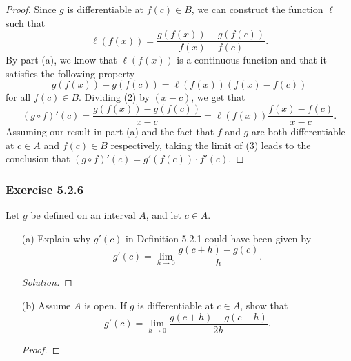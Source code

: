 \begin{enumerate}
\begin{proof}
        Since \( g  \) is differentiable at \( f(c) \in B  \), we can construct the function \( \ell  \) such that 
        \[  \ell(f(x)) = \frac{ g(f(x)) - g(f(c))  }{ f(x) - f(c) } \tag{1}.  \]
        By part (a), we know that \( \ell(f(x))  \) is a continuous function and that it satisfies the following property 
        \[  g(f(x)) - g(f(c)) =  \ell(f(x)) (f(x) - f(c)) \tag{2}  \]
for all \( f(c) \in B  \). Dividing (2) by \( (x-c) \), we get that 
\[ (g \circ f)'(c)= \frac{ g(f(x)) - g(f(c))  }{ x - c   } = \ell(f(x)) \frac{ f(x) - f(c)  }{ x - c  } \tag{3}.  \]
Assuming our result in part (a) and the fact that \( f  \) and \( g  \) are both differentiable at \( c \in A  \) and \( f(c) \in B  \) respectively, taking the limit of (3) leads to 
the conclusion that \( (g \circ f)'(c) = g'(f(c)) \cdot f'(c) \). 
        \end{proof}
\end{enumerate}


\subsubsection{Exercise 5.2.6} 
Let \( g  \) be defined on an interval \( A  \), and let \( c \in A  \).
\begin{enumerate}
    \item[(a)] Explain why \( g'(c)  \) in Definition 5.2.1 could have been given by
        \[  g'(c) = \lim_{ h \to 0 } \frac{ g(c + h) - g(c)  }{ h }. \]
        \begin{proof}[Solution]
        
        \end{proof}
    \item[(b)] Assume \( A  \) is open. If \( g  \) is differentiable at \( c \in A  \), show that 
        \[  g'(c) = \lim_{ h \to 0 } \frac{ g(c+h) - g(c-h)  }{ 2h }. \]
        \begin{proof}
        
        \end{proof}
\end{enumerate}













